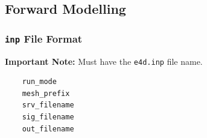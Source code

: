 \documentclass[a4paper,12pt]{article}
\begin{document}
\newpage
\subsection{Forward Modelling}

\subsubsection{\texttt{inp} File Format} \label{forward_inp}

\begin{framed}
\noindent \textbf{Important Note:} Must have the \texttt{e4d.inp} file name.
\end{framed}

\begin{framed}
\begin{verbatim}
    run_mode
    mesh_prefix
    srv_filename
    sig_filename
    out_filename
\end{verbatim}
\end{framed}
\end{document}

